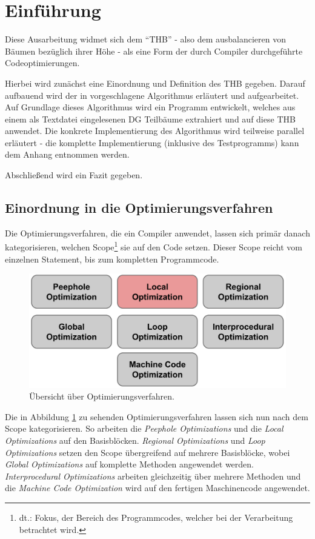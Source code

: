 \chapter{Einführung}
\label{Einfuehrung}
Diese Ausarbeitung widmet sich dem \enquote{\ac{THB}} - also dem ausbalancieren von Bäumen bezüglich ihrer Höhe - als eine Form der durch Compiler durchgeführte Codeoptimierungen.

Hierbei wird zunächst eine Einordnung und Definition des \ac{THB} gegeben. Darauf aufbauend wird der in \cite{HeBIS-309344573} vorgeschlagene Algorithmus erläutert und aufgearbeitet. Auf Grundlage dieses Algorithmus wird ein Programm entwickelt, welches aus einem als Textdatei eingelesenen \ac{DG} Teilbäume extrahiert und auf diese \ac{THB} anwendet. Die konkrete Implementierung des Algorithmus wird teilweise parallel erläutert - die komplette Implementierung (inklusive des Testprogramms) kann dem Anhang entnommen werden.

Abschließend wird ein Fazit gegeben.


\section{Einordnung in die Optimierungsverfahren}

Die Optimierungsverfahren, die ein Compiler anwendet, lassen sich primär danach kategorisieren, welchen Scope\footnote{dt.: Fokus, der Bereich des Programmcodes, welcher bei der Verarbeitung betrachtet wird.} sie auf den Code setzen. Dieser Scope reicht vom einzelnen Statement, bis zum kompletten Programmcode.

\begin{figure}[h]
	\centering
	\includegraphics[scale=0.5]{images/Einordnung.png}
	\caption{Übersicht über Optimierungsverfahren.}
	\label{fig:Einordnung}
\end{figure}

Die in Abbildung \ref{Einfuehrung} zu sehenden Optimierungsverfahren lassen sich nun nach dem Scope kategorisieren. So arbeiten die \textit{Peephole Optimizations} und die \textit{Local Optimizations} auf den Basisblöcken. \textit{Regional Optimizations} und \textit{Loop Optimizations} setzen den Scope übergreifend auf mehrere Basisblöcke, wobei \textit{Global Optimizations} auf komplette Methoden angewendet werden. \textit{Interprocedural Optimizations} arbeiten gleichzeitig über mehrere Methoden und die \textit{Machine Code Optimization} wird auf den fertigen Maschinencode angewendet.

